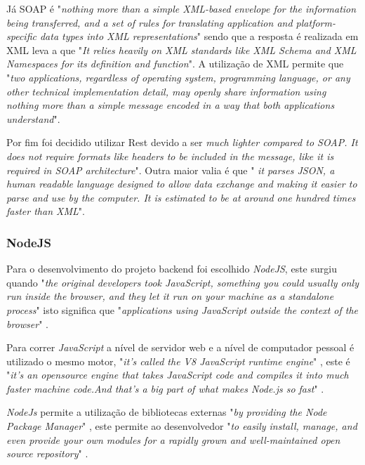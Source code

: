Já SOAP é "\emph{nothing  more  than  a  simple  XML-based  envelope  for  the  information  being  transferred,  and  a  set  of  rules  for  translating  application and platform-specific data types into XML representations}"\citep{Snell2002} sendo que a resposta é realizada em XML leva a que "\emph{It relies heavily on XML  standards  like  XML  Schema  and  XML  Namespaces  for  its  definition  and  function}"\citep{Snell2002}. A utilização de XML permite que "\emph{two  applications,  regardless  of  operating  system,  programming  language,  or  any  other  technical  implementation  detail,  may  openly  share  information  using  nothing  more  than  a  simple  message  encoded  in  a  way  that  both  applications  understand}"\citep{Snell2002}.

Por fim foi decidido utilizar Rest devido a ser \emph{much lighter compared to SOAP. It does not require formats like headers to be included in the message, like it is required in SOAP architecture}". Outra maior valia é que "\emph{ it parses JSON, a human readable language designed to allow data exchange and making it easier to parse and use by the computer. It is estimated to be at around one hundred times faster than XML}"\citep{Halili2018}.

\newpage

\subsubsection{NodeJS}

Para o desenvolvimento do projeto backend foi escolhido \textit{NodeJS}, este surgiu quando "\emph{the original developers took JavaScript, something you could usually only run inside the browser, and they let it run on your machine as a standalone process}"\citep{design_node} isto significa que "\emph{applications using JavaScript outside the context of the browser}"\citep{design_node} .

Para correr \textit{JavaScript} a nível de servidor web e a nível de computador pessoal é utilizado o mesmo motor, "\emph{it's called the V8 JavaScript runtime engine}"\citep{design_node} , este é "\emph{it's an opensource engine that takes JavaScript code and compiles it into much faster machine code.And that's a big part of what makes Node.js so fast}"\citep{design_node} .

\textit{NodeJs} permite a utilização de bibliotecas externas "\emph{by providing the Node Package Manager}"\citep{design_node} , este permite ao desenvolvedor "\emph{to easily install, manage, and even provide  your own modules for a rapidly grown and well-maintained open source repository}"\citep{design_node} .

